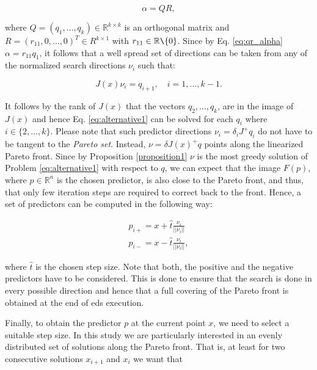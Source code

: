 \begin{equation}
\alpha = QR,
\label{eq:qr_alpha}
\end{equation} 

where $Q = (q_1, \ldots, q_k) \in \mathbb{R}^{k \times k}$ is an orthogonal matrix and $R = (r_{11}, 0, \ldots, 0)^T \in R^{k \times 1}$ with $r_{11} \in \mathbb{R} \texttt{\char`\\} \{0\}$. Since by Eq. \eqref{eq:qr_alpha} $\alpha = r_{11}	q_1$, it follows that a well spread set of directions can be taken from any of the normalized search directions $\nu_i$ such that:

\begin{equation}
J(x)\nu_i = q_{i+1}, \quad i = 1, \ldots, k-1. 
\label{eq:ds_predictor}
\end{equation}

It follows by the rank of $J(x)$ that the vectors $q_2, \ldots, q_k$, are in the image of $J(x)$ and hence Eq. \eqref{eq:alternative1} can be solved for each $q_i$ where $i \in \{2, \ldots, k\}$. Please note that such predictor directions $\nu_i = \delta_i J^+ q_i$ do not have to be tangent to the \emph{Pareto set}. Instead, $\nu = \delta J(x)^+ q$ points along the linearized Pareto front. Since by Proposition \ref{proposition1} $\nu$ is the most greedy solution of Problem \eqref{eq:alternative1} with respect to $q$, we can expect that the image $F(p)$, where $p \in \mathbb{R}^n$ is the chosen predictor, is also close to the Pareto front, and thus, that only few iteration steps are required to correct back to the front. Hence, a set of predictors can be computed in the following way:

\begin{eqnarray}
p_{i+} = x + \hat{t} \frac{\nu_i}{||\nu_i||} \nonumber \\
p_{i-} = x - \hat{t} \frac{\nu_i}{||\nu_i||},
\label{eq:movement_predictor}
\end{eqnarray}

where $\hat{t}$ is the chosen step size. Note that both, the positive and the negative predictors have to be considered. This is done to ensure that the search is done in every possible direction and hence that a full covering of the Pareto front is obtained at the end of \gls{eds} execution.

Finally, to obtain the predictor $p$ at the current point $x$, we need to select a suitable step size. In this study we are particularly interested in an evenly distributed set of solutions along the Pareto front. That is, at least for two consecutive solutions $x_{i+1}$ and $x_i$ we want that

